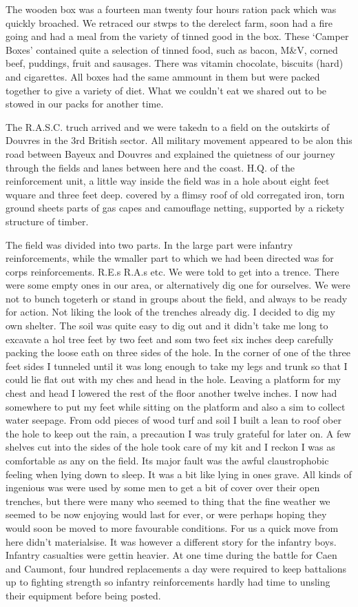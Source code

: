 The wooden box was a fourteen man twenty four hours ration pack which
was quickly broached. We retraced our stwps to the derelect farm, soon
had a fire going and had a meal from the variety of tinned good in the
box. These `Camper Boxes' contained quite a selection of tinned food,
such as bacon, M\&V, corned beef, puddings, fruit and sausages. There
was vitamin chocolate, biscuits (hard) and cigarettes. All boxes had
the same ammount in them but were packed together to give a variety of
diet. What we couldn't eat we shared out to be stowed in our packs for
another time.

The R.A.S.C. truch arrived and we were takedn to a field on the
outskirts of Douvres in the 3rd British sector. All military movement
appeared to be alon this road between Bayeux and Douvres and explained
the quietness of our journey through the fields and lanes between here
and the coast. H.Q. of the reinforcement unit, a little way inside the
field was in a hole about eight feet wquare and three feet
deep. covered by a flimsy roof of old corregated iron, torn ground
sheets parts of gas capes and camouflage netting, supported by a
rickety structure of timber.

The field was divided into two parts. In the large part were infantry
reinforcements, while the wmaller part to which we had been directed
was for corps reinforcements. R.E.s R.A.s etc. We were told to get
into a trence. There were some empty ones in our area, or
alternatively dig one for ourselves. We were not to bunch togeterh or
stand in groups about the field, and always to be ready for
action. Not liking the look of the trenches already dig. I decided to
dig my own shelter. The soil was quite easy to dig out and it didn't
take me long to excavate a hol tree feet by two feet and som two feet
six inches deep carefully packing the loose eath on three sides of the
hole. In the corner of one of the three feet sides I tunneled until it
was long enough to take my legs and trunk so that I could lie flat out
with my ches and head in the hole. Leaving a platform for my chest and
head I lowered the rest of the floor another twelve inches. I now had
somewhere to put my feet while sitting on the platform and also a sim
to collect water seepage. From odd pieces of wood turf and soil I
built a lean to roof ober the hole to keep out the rain, a precaution
I was truly grateful for later on. A few shelves cut into the sides of
the hole took care of my kit and I reckon I was as comfortable as any
on the field. Its major fault was the awful claustrophobic feeling
when lying down to sleep. It was a bit like lying in ones grave. All
kinds of ingenious was were used by some men to get a bit of cover
over their open trenches, but there were many who seemed to thing that
the fine weather we seemed to be now enjoying would last for ever, or
were perhaps hoping they would soon be moved to more favourable
conditions. For us a quick move from here didn't materialsise. It was
however a different story for the infantry boys. Infantry casualties
were gettin heavier. At one time during the battle for Caen and
Caumont, four hundred replacements a day were required to keep
battalions up to fighting strength so infantry reinforcements hardly
had time to unsling their equipment before being posted.

